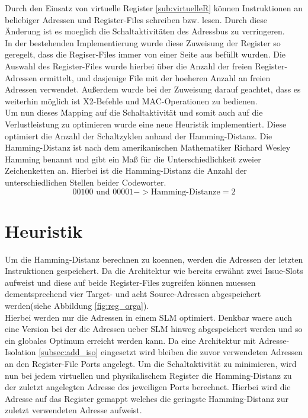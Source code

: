 Durch den Einsatz von virtuelle Register \ref{sub:virtuelleR} können Instruktionen an beliebiger Adressen und Register-Files schreiben bzw. lesen. Durch diese Änderung ist es moeglich die Schaltaktivitäten des Adressbus zu verringeren.\\
In der bestehenden Implementierung wurde diese Zuweisung der Register so geregelt, dass die Regiser-Files immer von einer Seite aus befüllt wurden. Die Auswahl des Register-Files wurde hierbei über die Anzahl der freien Register-Adressen ermittelt, und dasjenige File mit der hoeheren Anzahl an freien Adressen verwendet. Außerdem wurde bei der Zuweisung darauf geachtet, dass es weiterhin möglich ist X2-Befehle und MAC-Operationen zu bedienen.\\
Um nun dieses Mapping auf die Schaltaktivität und somit auch auf die Verlustleistung zu optimieren wurde eine neue Heuristik implementiert.
Diese optimiert die Anzahl der Schaltzyklen anhand der Hamming-Distanz.
Die Hamming-Distanz ist nach dem amerikanischen Mathematiker Richard Wesley Hamming benannt und gibt ein Maß für die Unterschiedlichkeit zweier Zeichenketten an. Hierbei ist die Hamming-Distanz die Anzahl der unterschiedlichen Stellen beider Codeworter.
\begin{equation}
00100 \text{ und } 00001 -> \text{Hamming-Distanze}= 2
\label{eq:hammingdistanze}
\end{equation}
 
\section{Heuristik}
\label{sec:Heuristik}

Um die Hamming-Distanz berechnen zu koennen, werden die Adressen der letzten Instruktionen gespeichert. Da die Architektur wie bereits erwähnt zwei Issue-Slots aufweist und diese auf beide Register-Files zugreifen können muessen dementsprechend vier Target- und acht Source-Adressen abgespeichert werden(siehe Abbildung \ref{fig:reg_orga}).\\
Hierbei werden nur die Adressen in einem SLM optimiert. Denkbar waere auch eine Version bei der die Adressen ueber SLM hinweg abgespeichert werden und so ein globales Optimum erreicht werden kann.
Da eine Architektur mit Adresse-Isolation \ref{subsec:add_iso} eingesetzt wird bleiben die zuvor verwendeten Adressen an den Register-File Ports angelegt. Um die Schaltaktivität zu minimieren, wird nun bei jedem virtuellen und physikalischem Register die Hamming-Distanz zu der zuletzt angelegten Adresse des jeweiligen Ports berechnet. Hierbei wird die Adresse auf das Register gemappt welches die geringste Hamming-Distanz zur zuletzt verwendeten Adresse aufweist.\\

